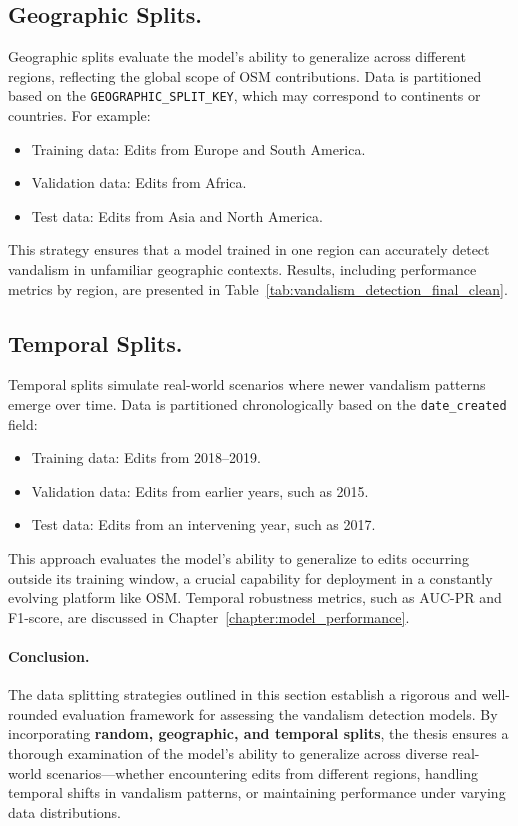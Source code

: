 \documentclass[
    13pt, %
    a4paper, %
    listof=totoc, %
    bibliography=totoc, %
    index=totoc, %
    headsepline
]{scrreprt}
\begin{document}
\subsection{Geographic Splits.}
Geographic splits evaluate the model's ability to generalize across different regions, reflecting the global scope of OSM contributions. Data is partitioned based on the \texttt{GEOGRAPHIC\_SPLIT\_KEY}, which may correspond to continents or countries. For example:
\begin{itemize}
    \item Training data: Edits from Europe and South America.
    \item Validation data: Edits from Africa.
    \item Test data: Edits from Asia and North America.
\end{itemize}

This strategy ensures that a model trained in one region can accurately detect vandalism in unfamiliar geographic contexts. Results, including performance metrics by region, are presented in Table~\ref{tab:vandalism_detection_final_clean}.

\subsection{Temporal Splits.}
Temporal splits simulate real-world scenarios where newer vandalism patterns emerge over time. Data is partitioned chronologically based on the \texttt{date\_created} field:
\begin{itemize}
    \item Training data: Edits from 2018--2019.
    \item Validation data: Edits from earlier years, such as 2015.
    \item Test data: Edits from an intervening year, such as 2017.
\end{itemize}

This approach evaluates the model’s ability to generalize to edits occurring outside its training window, a crucial capability for deployment in a constantly evolving platform like OSM. Temporal robustness metrics, such as AUC-PR and F1-score, are discussed in Chapter~\ref{chapter:model_performance}.

\paragraph{Conclusion.}
The data splitting strategies outlined in this section establish a rigorous and well-rounded evaluation framework for assessing the vandalism detection models. By incorporating \textbf{random, geographic, and temporal splits}, the thesis ensures a thorough examination of the model’s ability to generalize across diverse real-world scenarios—whether encountering edits from different regions, handling temporal shifts in vandalism patterns, or maintaining performance under varying data distributions.
\end{document}
